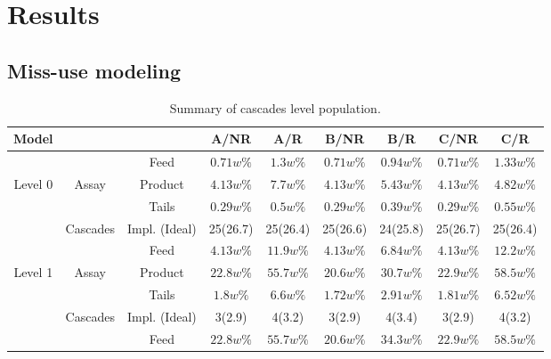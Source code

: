 \section{Results}

\subsection{Miss-use modeling}

\begin{table}[h!]
\centering
  \caption{Summary of cascades level population.}
\begin{tabular}{ccccccccc}
\toprule

Model       &        &            & A/NR      & A/R       & B/NR      & B/R      & C/NR       & C/R       \\
\midrule                                                                                                 
        &            & Feed       & $0.71w\%$ & $1.3w\%$  & $0.71w\%$ & $0.94w\%$ & $0.71w\%$ & $1.33w\%$ \\
Level 0 & Assay      & Product    & $4.13w\%$ & $7.7w\%$  & $4.13w\%$ & $5.43w\%$ & $4.13w\%$ & $4.82w\%$ \\
        &            & Tails      & $0.29w\%$ & $0.5w\%$  & $0.29w\%$ & $0.39w\%$ & $0.29w\%$ & $0.55w\%$ \\
        & Cascades   & Impl. (Ideal)& 25(26.7)  & 25(26.4)  & 25(26.6)  & 24(25.8)  & 25(26.7)  & 25(26.4)  \\
\midrule                                                                                                 
        &            & Feed       & $4.13w\%$ & $11.9w\%$ & $4.13w\%$ & $6.84w\%$ & $4.13w\%$ & $12.2w\%$ \\
Level 1 & Assay      & Product    & $22.8w\%$ & $55.7w\%$ & $20.6w\%$ & $30.7w\%$ & $22.9w\%$ & $58.5w\%$ \\
        &            & Tails      & $1.8w\%$  & $6.6w\%$  & $1.72w\%$ & $2.91w\%$ & $1.81w\%$ & $6.52w\%$ \\
        & Cascades   & Impl. (Ideal)& 3(2.9)    & 4(3.2)    & 3(2.9)    & 4(3.4)    & 3(2.9)    & 4(3.2)    \\
\midrule                                                                                                 
        &            & Feed       & $22.8w\%$ & $55.7w\%$ & $20.6w\%$ & $34.3w\%$ & $22.9w\%$ & $58.5w\%$ \\

\end{tabular}
\end{table}
